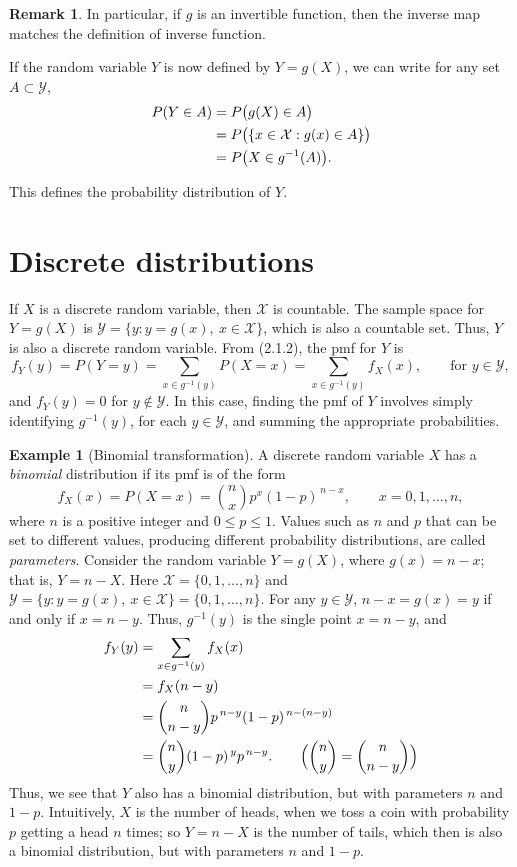 \documentclass{article}
\theoremstyle{plain}
\theoremstyle{definition}
\newtheorem{rem}[thm]{Remark}
\newtheorem{exa}[thm]{Example}
\begin{document}
\begin{rem}
    In particular, if $g$ is an invertible function, then the inverse map matches the definition of inverse function. 
\end{rem}

If the random variable $Y$ is now
defined by $Y=g(X)$, we can write for any set $A\subset \mathcal{Y}$,
\begin{align*}
P(Y\in A) &= P\bigl(g(X)\in A\bigr) \notag\\
         &= P\bigl(\{x\in\mathcal{X}: g(x)\in A\}\bigr) \notag\\
         &= P\bigl(X\in g^{-1}(A)\bigr).
\end{align*}

This defines the probability distribution of $Y$. 

\section{Discrete distributions}
If $X$ is a discrete random variable, then $\mathcal{X}$ is countable. The sample
space for $Y=g(X)$ is $\mathcal{Y}=\{y: y=g(x),\ x\in\mathcal{X}\}$, which is also a
countable set. Thus, $Y$ is also a discrete random variable. From (2.1.2), the pmf
for $Y$ is
\[
f_Y(y)=P(Y=y)=\sum_{x\in g^{-1}(y)} P(X=x)
       =\sum_{x\in g^{-1}(y)} f_X(x), \qquad \text{for } y\in\mathcal{Y},
\]
and $f_Y(y)=0$ for $y\notin\mathcal{Y}$. In this case, finding the pmf of $Y$ involves
simply identifying $g^{-1}(y)$, for each $y\in\mathcal{Y}$, and summing the appropriate
probabilities.

\begin{exa}[Binomial transformation]
    A discrete random variable $X$ has a \emph{binomial} distribution if its pmf is of the form
\begin{equation*}
f_X(x)=P(X=x)=\binom{n}{x}p^{x}(1-p)^{\,n-x}, \qquad x=0,1,\ldots,n,
\end{equation*}
where $n$ is a positive integer and $0\le p\le 1$. Values such as $n$ and $p$ that can be
set to different values, producing different probability distributions, are called
\emph{parameters}. Consider the random variable $Y=g(X)$, where $g(x)=n-x$; that is,
$Y=n-X$. Here $\mathcal{X}=\{0,1,\ldots,n\}$ and
$\mathcal{Y}=\{y: y=g(x),\ x\in\mathcal{X}\}=\{0,1,\ldots,n\}$.
For any $y\in\mathcal{Y}$, $n-x=g(x)=y$ if and only if $x=n-y$. Thus, $g^{-1}(y)$ is the
single point $x=n-y$, and
\begin{align*}
f_Y(y)
&= \sum_{x\in g^{-1}(y)} f_X(x)\\
&= f_X(n-y)\\
&= \binom{n}{n-y}p^{\,n-y}(1-p)^{\,n-(n-y)}\\
&= \binom{n}{y}(1-p)^{\,y}p^{\,n-y}.
\qquad \Bigl( \binom{n}{y}=\binom{n}{n-y}\Bigr)
\end{align*}
Thus, we see that $Y$ also has a binomial distribution, but with parameters $n$ and
$1-p$. Intuitively, $X$ is the number of heads, when we toss a coin with probability $p$ getting a head $n$ times; so $Y=n-X$ is the number of tails, which then is also a binomial distribution, but with parameters $n$ and $1-p$. 
\end{exa}  
\end{document}
